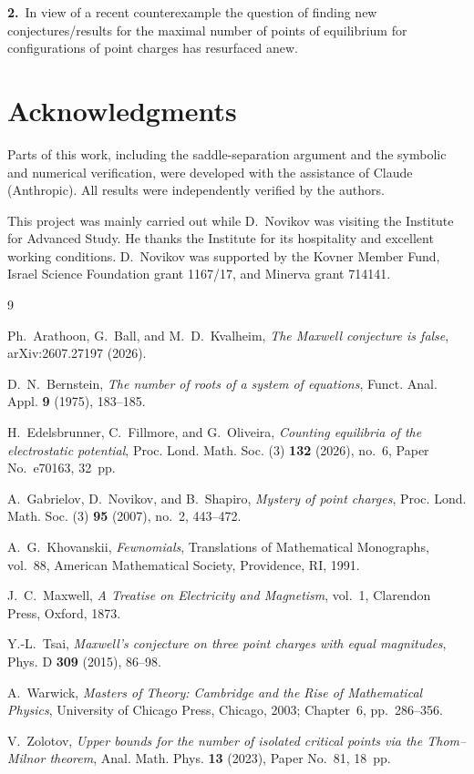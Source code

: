 \documentclass[10pt,reqno]{amsart}
\numberwithin{equation}{section}
\theoremstyle{plain}
\theoremstyle{remark}
\begin{document}
\noindent
{\bf 2.} In view of a recent counterexample \cite{ABK} the question of finding  new conjectures/results for the maximal number of points of equilibrium for configurations of point charges has resurfaced anew. 

\section*{Acknowledgments}

Parts of this work, including the saddle-separation argument and the symbolic and numerical verification, were developed with the assistance of Claude (Anthropic). All results were independently verified by the authors. 

This project  was mainly carried out while D.~Novikov was visiting the
Institute for Advanced Study.  He thanks the Institute for its 
hospitality and excellent working conditions.  D.~Novikov was supported
by the Kovner Member Fund, Israel Science Foundation grant 1167/17, and
Minerva grant 714141.

\begin{thebibliography}{9}

Ph.~Arathoon, G.~Ball, and M.~D.~Kvalheim,
\emph{The Maxwell conjecture is false},
arXiv:2607.27197 (2026).

D.~N.~Bernstein,
\emph{The number of roots of a system of equations},
Funct. Anal. Appl. \textbf{9} (1975), 183--185.

H.~Edelsbrunner, C.~Fillmore, and G.~Oliveira,
\emph{Counting equilibria of the electrostatic potential},
Proc. Lond. Math. Soc. (3) \textbf{132} (2026), no.~6,
Paper No.~e70163, 32~pp.

A.~Gabrielov, D.~Novikov, and B.~Shapiro,
\emph{Mystery of point charges},
Proc. Lond. Math. Soc. (3) \textbf{95} (2007), no.~2, 443--472.

A.~G.~Khovanskii,
\emph{Fewnomials},
Translations of Mathematical Monographs, vol.~88,
American Mathematical Society, Providence, RI, 1991.

J.~C.~Maxwell,
\emph{A Treatise on Electricity and Magnetism}, vol.~1,
Clarendon Press, Oxford, 1873.

Y.-L.~Tsai,
\emph{Maxwell's conjecture on three point charges with equal magnitudes},
Phys. D \textbf{309} (2015), 86--98.

A.~Warwick,
\emph{Masters of Theory: Cambridge and the Rise of Mathematical Physics},
University of Chicago Press, Chicago, 2003; Chapter~6, pp.~286--356.

V.~Zolotov,
\emph{Upper bounds for the number of isolated critical points via the
Thom--Milnor theorem},
Anal. Math. Phys. \textbf{13} (2023), Paper No.~81, 18~pp.

\end{thebibliography}
\end{document}
